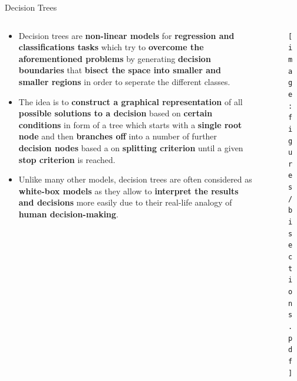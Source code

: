 \documentclass[document.tex]{subfiles}
\begin{document}
    \begin{frame}{Decision Trees}
        \begin{columns}
            \begin{column}{0.6\textwidth}
                \begin{itemize}
                    \item Decision trees are \textbf{non-linear models} for \textbf{regression and classifications tasks} which try to \textbf{overcome the aforementioned problems} by generating \textbf{decision boundaries} that \textbf{bisect the space into smaller and smaller regions} in order to seperate the different classes.
                    \item The idea is to \textbf{construct a graphical representation} of all \textbf{possible solutions to a decision} based on \textbf{certain conditions} in form of a tree which starts with a \textbf{single root node} and then \textbf{branches off} into a number of further \textbf{decision nodes} based a on \textbf{splitting criterion} until a given \textbf{stop criterion} is reached.
                    \item Unlike many other models, decision trees are often considered as \textbf{white-box models} as they allow to \textbf{interpret the results and decisions} more easily due to their real-life analogy of \textbf{human decision-making}. 
                \end{itemize}
            \end{column}
            \begin{column}{0.4\textwidth}
                \begin{figure}
                    \label{fig:bisections}
                    \texttt{[image: figures/bisections.pdf]}
                \end{figure}
            \end{column}
        \end{columns}
    \end{frame}
\end{document}
